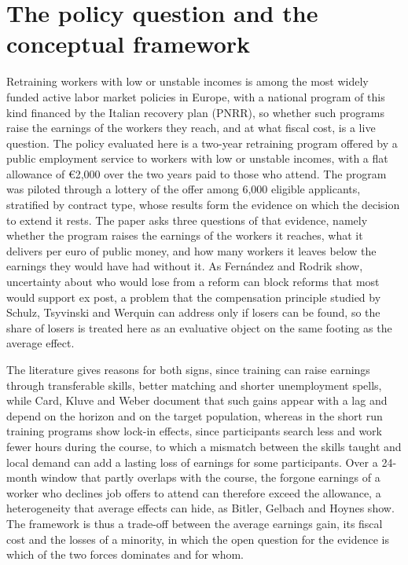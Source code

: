 \documentclass[11pt,a4paper]{article}
\begin{document}
\section{The policy question and the conceptual framework}
Retraining workers with low or unstable incomes is among the most widely funded active labor market policies in Europe, with a national program of this kind financed by the Italian recovery plan (PNRR), so whether such programs raise the earnings of the workers they reach, and at what fiscal cost, is a live question. The policy evaluated here is a two-year retraining program offered by a public employment service to workers with low or unstable incomes, with a flat allowance of €2,000 over the two years paid to those who attend. The program was piloted through a lottery of the offer among 6,000 eligible applicants, stratified by contract type, whose results form the evidence on which the decision to extend it rests. The paper asks three questions of that evidence, namely whether the program raises the earnings of the workers it reaches, what it delivers per euro of public money, and how many workers it leaves below the earnings they would have had without it. As Fernández and Rodrik \cite{fernandezrodrik} show, uncertainty about who would lose from a reform can block reforms that most would support ex post, a problem that the compensation principle studied by Schulz, Tsyvinski and Werquin \cite{schulz} can address only if losers can be found, so the share of losers is treated here as an evaluative object on the same footing as the average effect.

The literature gives reasons for both signs, since training can raise earnings through transferable skills, better matching and shorter unemployment spells, while Card, Kluve and Weber \cite{card} document that such gains appear with a lag and depend on the horizon and on the target population, whereas in the short run training programs show lock-in effects, since participants search less and work fewer hours during the course, to which a mismatch between the skills taught and local demand can add a lasting loss of earnings for some participants. Over a 24-month window that partly overlaps with the course, the forgone earnings of a worker who declines job offers to attend can therefore exceed the allowance, a heterogeneity that average effects can hide, as Bitler, Gelbach and Hoynes \cite{bitler} show. The framework is thus a trade-off between the average earnings gain, its fiscal cost and the losses of a minority, in which the open question for the evidence is which of the two forces dominates and for whom.
\end{document}
